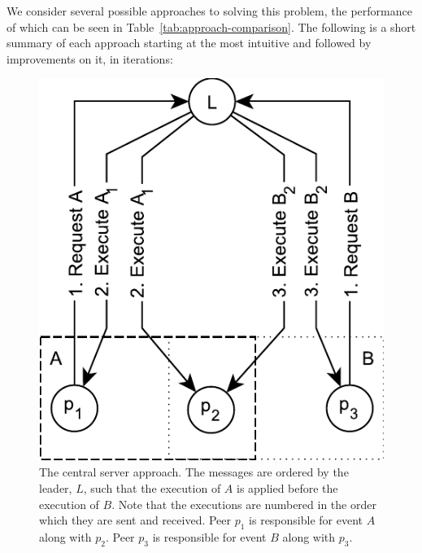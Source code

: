 \documentclass{article}
\begin{document}
	We consider several possible approaches to solving this problem, the performance of which can be seen in Table~\ref{tab:approach-comparison}.
	The following is a short summary of each approach starting at the most intuitive and followed by improvements on it, in iterations:

    \FloatBarrier
    \begin{figure}[ht!]
        \center
        \includegraphics[scale=0.7]{figures/dcr-graphs/central-server-approach}
        \caption{The central server approach.
        The messages are ordered by the leader, $L$, such that the execution of $A$ is applied before the execution of $B$.
        Note that the executions are numbered in the order which they are sent and received.
        Peer $p_1$ is responsible for event $A$ along with $p_2$.
        Peer $p_3$ is responsible for event $B$ along with $p_3$.}
        \label{fig:central-server-approach}
    \end{figure}
    \FloatBarrier
\end{document}

